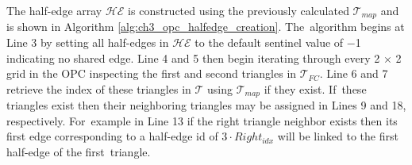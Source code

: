 The half-edge array $\mathcal{HE}$ is constructed 
using the previously calculated $\mathcal{T}_{map}$ and is shown in Algorithm \ref{alg:ch3_opc_halfedge_creation}. The~algorithm begins at Line 3 by setting all half-edges in $\mathcal{HE}$ to the default sentinel value of $-$1 indicating no shared edge.  Line 4 and 5 then begin iterating through every 2 $\times$ 2 grid in the \ac{OPC} inspecting the first and second triangles in $\mathcal{T}_{FC}$. Line 6 and 7 retrieve the index of these triangles in $\mathcal{T}$ using $\mathcal{T}_{map}$ if they exist. If~these triangles exist then their neighboring triangles may be assigned in Lines 9 and 18, respectively. For~example in Line 13 if the right triangle neighbor exists then its first edge corresponding to a half-edge id of $3 \cdot Right_{idx}$ will be linked to the first half-edge of the first~triangle.

